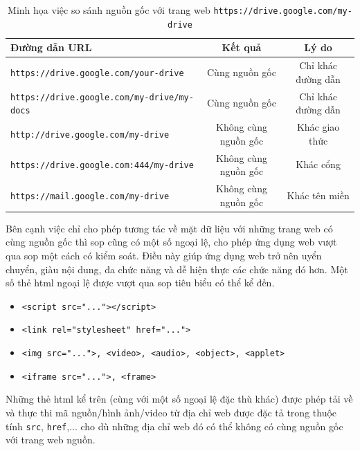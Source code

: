 \begin{table}[ht]
    \centering
    \caption{Minh họa việc so sánh nguồn gốc với trang web \texttt{https://drive.google.com/my-drive}}
    \label{tab:SOP-example}
    \begin{tabular}[t]{lcc}
        \toprule[1pt]\midrule[0.3pt]
            \textbf{Đường dẫn URL}&\textbf{Kết quả}&\textbf{Lý do}\\
        \midrule
            \texttt{https://drive.google.com/your-drive}&Cùng nguồn gốc&Chỉ khác đường dẫn\\
            \addlinespace
            \texttt{https://drive.google.com/my-drive/my-docs}&Cùng nguồn gốc&Chỉ khác đường dẫn\\
            \addlinespace
            \texttt{http://drive.google.com/my-drive}&Không cùng nguồn gốc&Khác giao thức\\
            \addlinespace
            \texttt{https://drive.google.com:444/my-drive}&Không cùng nguồn gốc&Khác cổng\\
            \addlinespace
            \texttt{https://mail.google.com/my-drive}&Không cùng nguồn gốc&Khác tên miền\\
        \midrule[0.3pt]\bottomrule[1pt]
    \end{tabular}
\end{table}
Bên cạnh việc chỉ cho phép tương tác về mặt dữ liệu với những trang web có cùng nguồn gốc thì \acrshort{sop} cũng có một số ngoại lệ, cho phép ứng dụng web vượt qua \acrshort{sop} một cách có kiểm soát. Điều này giúp ứng dụng web trở nên uyển chuyển, giàu nội dung, đa chức năng và dễ hiện thực các chức năng đó hơn. Một số thẻ \acrshort{html} ngoại lệ được vượt qua \acrshort{sop} tiêu biểu có thể kể đến.
\begin{itemize}
    \item \texttt{<script src="..."></script>}
    \item \texttt{<link rel="stylesheet" href="...">}
    \item \texttt{<img src="...">, <video>, <audio>, <object>, <applet>}
    \item \texttt{<iframe src="...">, <frame>}
\end{itemize}
Những thẻ \acrshort{html} kể trên (cùng với một số ngoại lệ đặc thù khác) được phép tải về và thực thi mã nguồn/hình ảnh/video từ địa chỉ web được đặc tả trong thuộc tính \texttt{src}, \texttt{href},... cho dù những địa chỉ web đó có thể không có cùng nguồn gốc với trang web nguồn.
